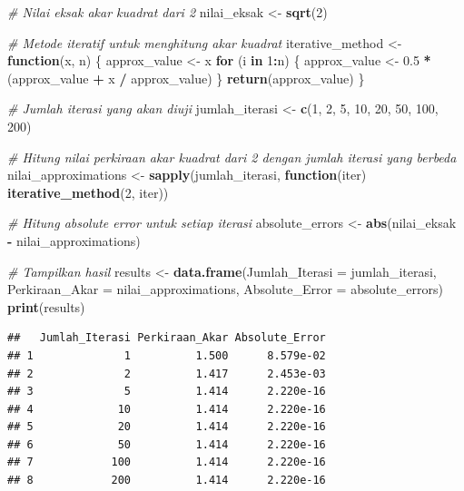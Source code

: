 \documentclass[
]{book}
\newenvironment{Shaded}{\begin{snugshade}}{\end{snugshade}}
\newcommand{\AttributeTok}[1]{\textcolor[rgb]{0.13,0.29,0.53}{#1}}
\newcommand{\CommentTok}[1]{\textcolor[rgb]{0.56,0.35,0.01}{\textit{#1}}}
\newcommand{\ControlFlowTok}[1]{\textcolor[rgb]{0.13,0.29,0.53}{\textbf{#1}}}
\newcommand{\DecValTok}[1]{\textcolor[rgb]{0.00,0.00,0.81}{#1}}
\newcommand{\FloatTok}[1]{\textcolor[rgb]{0.00,0.00,0.81}{#1}}
\newcommand{\FunctionTok}[1]{\textcolor[rgb]{0.13,0.29,0.53}{\textbf{#1}}}
\newcommand{\NormalTok}[1]{#1}
\newcommand{\OtherTok}[1]{\textcolor[rgb]{0.56,0.35,0.01}{#1}}
\newcommand{\SpecialCharTok}[1]{\textcolor[rgb]{0.81,0.36,0.00}{\textbf{#1}}}
\theoremstyle{definition}
\theoremstyle{definition}
\theoremstyle{definition}
\theoremstyle{definition}
\theoremstyle{remark}
\begin{document}
\begin{Shaded}
\begin{Highlighting}[]
\CommentTok{\# Nilai eksak akar kuadrat dari 2}
\NormalTok{nilai\_eksak }\OtherTok{\textless{}{-}} \FunctionTok{sqrt}\NormalTok{(}\DecValTok{2}\NormalTok{)}

\CommentTok{\# Metode iteratif untuk menghitung akar kuadrat}
\NormalTok{iterative\_method }\OtherTok{\textless{}{-}} \ControlFlowTok{function}\NormalTok{(x, n) \{}
\NormalTok{  approx\_value }\OtherTok{\textless{}{-}}\NormalTok{ x}
  \ControlFlowTok{for}\NormalTok{ (i }\ControlFlowTok{in} \DecValTok{1}\SpecialCharTok{:}\NormalTok{n) \{}
\NormalTok{    approx\_value }\OtherTok{\textless{}{-}} \FloatTok{0.5} \SpecialCharTok{*}\NormalTok{ (approx\_value }\SpecialCharTok{+}\NormalTok{ x }\SpecialCharTok{/}\NormalTok{ approx\_value)}
\NormalTok{  \}}
  \FunctionTok{return}\NormalTok{(approx\_value)}
\NormalTok{\}}

\CommentTok{\# Jumlah iterasi yang akan diuji}
\NormalTok{jumlah\_iterasi }\OtherTok{\textless{}{-}} \FunctionTok{c}\NormalTok{(}\DecValTok{1}\NormalTok{, }\DecValTok{2}\NormalTok{, }\DecValTok{5}\NormalTok{, }\DecValTok{10}\NormalTok{, }\DecValTok{20}\NormalTok{, }\DecValTok{50}\NormalTok{, }\DecValTok{100}\NormalTok{, }\DecValTok{200}\NormalTok{)}

\CommentTok{\# Hitung nilai perkiraan akar kuadrat dari 2 dengan jumlah iterasi yang berbeda}
\NormalTok{nilai\_approximations }\OtherTok{\textless{}{-}} \FunctionTok{sapply}\NormalTok{(jumlah\_iterasi, }\ControlFlowTok{function}\NormalTok{(iter) }\FunctionTok{iterative\_method}\NormalTok{(}\DecValTok{2}\NormalTok{, iter))}

\CommentTok{\# Hitung absolute error untuk setiap iterasi}
\NormalTok{absolute\_errors }\OtherTok{\textless{}{-}} \FunctionTok{abs}\NormalTok{(nilai\_eksak }\SpecialCharTok{{-}}\NormalTok{ nilai\_approximations)}

\CommentTok{\# Tampilkan hasil}
\NormalTok{results }\OtherTok{\textless{}{-}} \FunctionTok{data.frame}\NormalTok{(}\AttributeTok{Jumlah\_Iterasi =}\NormalTok{ jumlah\_iterasi, }\AttributeTok{Perkiraan\_Akar =}\NormalTok{ nilai\_approximations, }\AttributeTok{Absolute\_Error =}\NormalTok{ absolute\_errors)}
\FunctionTok{print}\NormalTok{(results)}
\end{Highlighting}
\end{Shaded}

\begin{verbatim}
##   Jumlah_Iterasi Perkiraan_Akar Absolute_Error
## 1              1          1.500      8.579e-02
## 2              2          1.417      2.453e-03
## 3              5          1.414      2.220e-16
## 4             10          1.414      2.220e-16
## 5             20          1.414      2.220e-16
## 6             50          1.414      2.220e-16
## 7            100          1.414      2.220e-16
## 8            200          1.414      2.220e-16
\end{verbatim}
\end{document}
